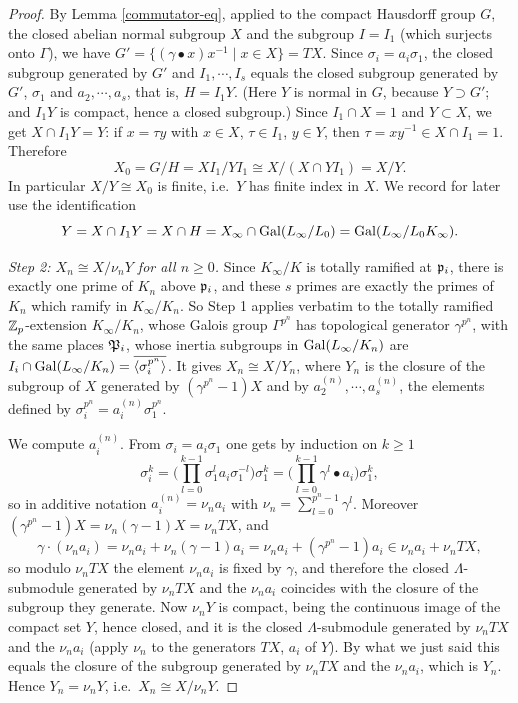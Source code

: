 \begin{proof}
By Lemma \ref{commutator-eq}, applied to the compact Hausdorff group $G$, the
closed abelian normal subgroup $X$ and the subgroup $I=I_1$ (which surjects onto
$\Gamma$), we have $G'=\{(\gamma\bullet x)x^{-1}\mid x\in X\}=TX$.
Since $\sigma_i=a_i\sigma_1$, the closed subgroup generated by $G'$ and
$I_1,\cdots,I_s$ equals the closed subgroup generated by $G'$, $\sigma_1$ and
$a_2,\cdots,a_s$, that is, $H=I_1Y$.
(Here $Y$ is normal in $G$, because $Y\supset G'$; and $I_1Y$ is compact, hence a
closed subgroup.)
Since $I_1\cap X=1$ and $Y\subset X$, we get $X\cap I_1Y=Y$: if $x=\tau y$ with
$x\in X$, $\tau\in I_1$, $y\in Y$, then $\tau=xy^{-1}\in X\cap I_1=1$.
Therefore
$$X_0=G/H=XI_1/YI_1\cong X/(X\cap YI_1)=X/Y .$$
In particular $X/Y\cong X_0$ is finite, i.e.~$Y$ has finite index in $X$.
We record for later use the identification
$$Y=X\cap I_1Y=X\cap H=X_\infty\cap{\mathrm{Gal}}(L_\infty/L_0)={\mathrm{Gal}}(L_\infty/L_0K_\infty).$$

\emph{Step 2: $X_n\cong X/\nu_nY$ for all $n\geq 0$.}
Since $K_\infty/K$ is totally ramified at ${\mathfrak{p}}_i$, there is exactly one prime of
$K_n$ above ${\mathfrak{p}}_i$, and these $s$ primes are exactly the primes of $K_n$ which
ramify in $K_\infty/K_n$.
So Step 1 applies verbatim to the totally ramified ${\mathbb {Z}}_p$-extension
$K_\infty/K_n$, whose Galois group $\Gamma^{p^n}$ has topological generator
$\gamma^{p^n}$, with the same places ${\mathfrak{P}}_i$, whose inertia subgroups in
${\mathrm{Gal}}(L_\infty/K_n)$ are
$I_i\cap{\mathrm{Gal}}(L_\infty/K_n)=\overline{\langle\sigma_i^{p^n}\rangle}$.
It gives $X_n\cong X/Y_n$, where $Y_n$ is the closure of the subgroup of $X$
generated by $(\gamma^{p^n}-1)X$ and by $a_2^{(n)},\cdots,a_s^{(n)}$, the
elements defined by $\sigma_i^{p^n}=a_i^{(n)}\sigma_1^{p^n}$.

We compute $a_i^{(n)}$. From $\sigma_i=a_i\sigma_1$ one gets by induction on
$k\geq 1$
$$\sigma_i^k=\Big(\prod_{l=0}^{k-1}\sigma_1^la_i\sigma_1^{-l}\Big)\sigma_1^k
=\Big(\prod_{l=0}^{k-1}\gamma^l\bullet a_i\Big)\sigma_1^k,$$
so in additive notation $a_i^{(n)}=\nu_na_i$ with
$\nu_n=\sum_{l=0}^{p^n-1}\gamma^l$.
Moreover $(\gamma^{p^n}-1)X=\nu_n(\gamma-1)X=\nu_nTX$, and
$$\gamma\cdot(\nu_na_i)=\nu_na_i+\nu_n(\gamma-1)a_i
=\nu_na_i+(\gamma^{p^n}-1)a_i\in\nu_na_i+\nu_nTX,$$
so modulo $\nu_nTX$ the element $\nu_na_i$ is fixed by $\gamma$, and therefore
the closed $\Lambda$-submodule generated by $\nu_nTX$ and the $\nu_na_i$
coincides with the closure of the subgroup they generate.
Now $\nu_nY$ is compact, being the continuous image of the compact set $Y$,
hence closed, and it is the closed $\Lambda$-submodule generated by $\nu_nTX$ and
the $\nu_na_i$ (apply $\nu_n$ to the generators $TX$, $a_i$ of $Y$).
By what we just said this equals the closure of the subgroup generated by
$\nu_nTX$ and the $\nu_na_i$, which is $Y_n$.
Hence $Y_n=\nu_nY$, i.e.~$X_n\cong X/\nu_nY$.


\end{proof}
